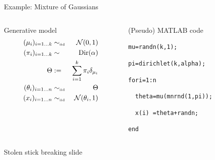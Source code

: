 \begin{frame}{Example: Mixture of Gaussians}
  \begin{columns}
    \begin{column}{.5\textwidth}
      \begin{block}{Generative model}
        \begin{eqnarray*}
          (\mu_i)_{i=1\ldots k} & \sim_{\mbox{\tiny iid}} & \mathcal{N}(0, 1) \\
          (\pi_i)_{i=1\ldots k} & \sim & \textrm{Dir}(\alpha) \\
          \Theta & := & \sum_{i=1}^k \pi_i \delta_{\mu_i} \\
          (\theta_i)_{i=1\ldots n} & \sim_{\mbox{\tiny iid}} & \Theta \\
          (x_i)_{i=1\ldots n} & \sim_{\mbox{\tiny iid}} & \mathcal{N}(\theta_i, 1)
        \end{eqnarray*}
      \end{block}
    \end{column}
    \begin{column}{.5\textwidth}
      \begin{block}{(Pseudo) MATLAB code}
        \vspace{0.75\baselineskip}
        \begin{alltt}
          mu = randn(k,1);

          pi = dirichlet(k, alpha);


          for i = 1:n
            
          \ \ theta = mu(mnrnd(1,pi));
          
          \ \ x(i) \ = theta + randn;
            
          end
        \end{alltt}
        \vspace{0.75\baselineskip}
      \end{block}
    \end{column}
  \end{columns}
\end{frame}

\begin{frame}{Stolen stick breaking slide}
\end{frame}

